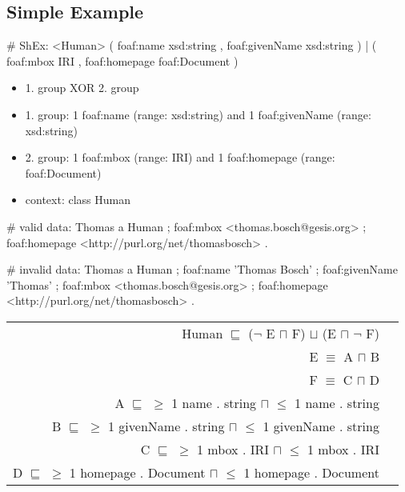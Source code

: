 \documentclass{llncs}
\newenvironment{DL}{
  \vspace{0cm}
	\begin{center}
  \begin{tabular}{r l}

}{
  \end{tabular}
	\end{center}
}
\begin{document}
\subsection{Simple Example}

\begin{ex}
# ShEx:
<Human> { 
    (  
        foaf:name xsd:string ,
        foaf:givenName xsd:string ) 
    |
    (
        foaf:mbox IRI ,
        foaf:homepage foaf:Document ) }
\end{ex}

\begin{itemize}
  \item 1. group XOR 2. group
	\item 1. group: 1 foaf:name (range: xsd:string) and 1 foaf:givenName (range: xsd:string)
	\item 2. group: 1 foaf:mbox (range: IRI) and 1 foaf:homepage (range: foaf:Document) 
	\item context: class Human
\end{itemize}

\begin{ex}
# valid data:
Thomas
    a Human ;
    foaf:mbox <thomas.bosch@gesis.org> ;
    foaf:homepage <http://purl.org/net/thomasbosch> .
\end{ex}

\begin{ex}
# invalid data:
Thomas
    a Human ;
    foaf:name 'Thomas Bosch' ;
    foaf:givenName 'Thomas' ;
    foaf:mbox <thomas.bosch@gesis.org> ;
    foaf:homepage <http://purl.org/net/thomasbosch> .
\end{ex}

\begin{DL}
Human $\sqsubseteq$ ($\neg$ E $\sqcap$ F) $\sqcup$ (E $\sqcap$ $\neg$ F) \\ 
E $\equiv$ A $\sqcap$ B \\
F $\equiv$ C $\sqcap$ D \\
A $\sqsubseteq$ $\geq$ 1 name . string $\sqcap$ $\leq$ 1 name . string \\
B $\sqsubseteq$ $\geq$ 1 givenName . string $\sqcap$ $\leq$ 1 givenName . string \\
C $\sqsubseteq$ $\geq$ 1 mbox . IRI $\sqcap$ $\leq$ 1 mbox . IRI \\
D $\sqsubseteq$ $\geq$ 1 homepage . Document $\sqcap$ $\leq$ 1 homepage . Document \\
\end{DL}
\end{document}
